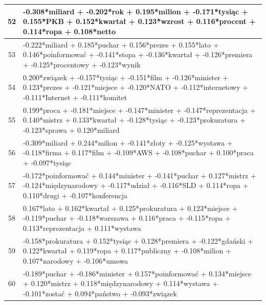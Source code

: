 \documentclass[11pt,a4paper]{article}
\begin{document}
\begin{table}[h]
\begin{tabular}{|c|>{\footnotesize}p{\linewidth}|}
52 & -0.308*miliard + -0.202*rok + 0.195*milion + -0.171*tysiąc + 0.155*PKB + 0.152*kwartał + 0.123*wzrost + 0.116*procent + 0.114*ropa + 0.108*netto\\\hline
53 & -0.222*miliard + 0.185*puchar + 0.156*prezes + 0.155*lato + 0.146*poinformować + -0.141*stopa + -0.136*kwartał + -0.126*premiera + -0.125*procentowy + -0.123*wynik\\\hline
54 & 0.200*związek + -0.157*tysiąc + -0.151*film + -0.126*minister + 0.123*prezes + -0.121*miejsce + -0.120*NATO + -0.112*internetowy + -0.111*Internet + -0.111*komitet\\\hline
55 & 0.199*proca + -0.181*miejsce + -0.147*minister + -0.147*reprezentacja + 0.140*mistrz + 0.133*kwartał + -0.128*tysiąc + -0.123*prokuratura + -0.123*sprawa + 0.120*miliard\\\hline
56 & -0.309*miliard + 0.244*milion + -0.141*złoty + -0.125*wystawa + -0.118*firma + 0.117*film + -0.109*AWS + -0.108*puchar + 0.100*praca + -0.097*tysiąc\\\hline
57 & -0.172*poinformować + 0.144*minister + -0.141*puchar + 0.127*mistrz + -0.124*międzynarodowy + -0.117*udział + -0.116*SLD + 0.114*ropa + 0.110*drugi + -0.107*konferencja\\\hline
58 & 0.167*lato + 0.162*kwartał + 0.125*prokuratura + 0.123*miejsce + -0.119*puchar + -0.118*warszawa + 0.116*praca + -0.115*ropa + 0.113*reprezentacja + 0.111*wystawa\\\hline
59 & -0.158*prokuratura + 0.152*tysiąc + 0.128*premiera + -0.122*gdański + 0.122*kwartał + 0.119*ropa + 0.117*publiczny + -0.108*milion + 0.107*narodowy + -0.106*umowa\\\hline
60 & -0.189*puchar + -0.186*minister + 0.157*poinformować + 0.134*miejsce + 0.120*mistrz + 0.118*międzynarodowy + 0.114*wystawa + -0.101*zostać + 0.094*państwo + -0.093*związek\\\hline

\end{tabular}
\end{table}
\end{document}
